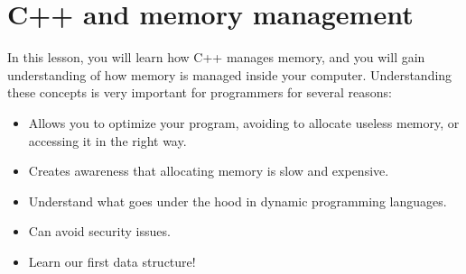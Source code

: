 \documentclass[../notebook.tex]{subfiles}
\begin{document}
\begin{center}

\end{center}

\section{ C++ and memory management }
In this lesson, you will learn how C++ manages memory, and you will gain understanding of how memory is managed inside your computer. Understanding these concepts is very important for programmers for several reasons:
\begin{itemize}
  \item Allows you to optimize your program, avoiding to allocate useless memory, or accessing it in the right way.
  \item Creates awareness that allocating memory is slow and expensive. 
  \item Understand what goes under the hood in dynamic programming languages.
  \item Can avoid security issues.
  \item Learn our first data structure!
\end{itemize}
\end{document}
